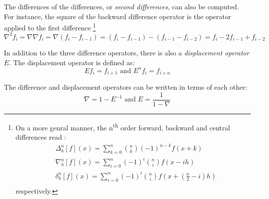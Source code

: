 The differences of the
differences, or \emph{second differences}, can also be computed. For instance,
the square of the backward difference operator is the operator applied to the first
difference \footnote{
  On a more genral manner, the n\textsuperscript{th} order forward, backward and central differences read :
\begin{equation}
  \begin{aligned}
  & {\Delta}^n_h [f](x) = \sum_{k=0}^n \binom{n}{k} (-1)^{n-k} f(x+k)\\
  & {\nabla}^n_h [f](x) = \sum_{i=0}^n (-1)^i \binom{n}{i} f(x-ih)\\
  & {\delta}^n_h [f](x) = \sum_{i=0}^n (-1)^i \binom{n}{i} f(x + (\frac{n}{2} -i)h)\\
  \end{aligned}
\end{equation}
respectively.}
\begin{equation}
  {\nabla}^2 f_i = \nabla \nabla f_i = \nabla (f_i - f_{i-1}) = 
  (f_i - f_{i-1}) - (f_{i-1} - f_{i-2}) = f_i - 2 f_{i-1} + f_{i-2}
\end{equation}

In addition to the three difference operators, there is also a 
\emph{displacement operator} \(E\). The displacement operator is defined as:
\begin{equation}
  E f_i = f_{i+1} \text{ and } E^n f_i = f_{i+n}
\end{equation}

The difference and displacement operators  can be written in terms of each other:
\begin{equation}
  \nabla = 1 - E^{-1} \text{ and } E = \frac{1}{1 - \nabla}
\end{equation}

